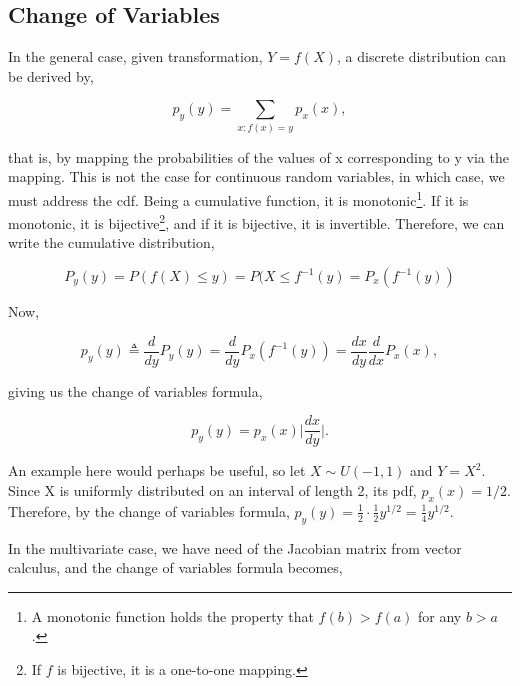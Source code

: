 \documentclass[11pt]{amsart}
\begin{document}
\subsection{Change of Variables}

In the general case, given transformation, $Y = f(X)$, a discrete distribution can be derived by,

$$p_y(y) = \sum_{x:f(x)=y} p_x(x),$$

that is, by mapping the probabilities of the values of x corresponding to y via the mapping. This is not the case for continuous random variables, in which case, we must address the cdf. Being a cumulative function, it is monotonic\footnote{A monotonic function holds the property that $f(b) > f(a)$ for any $b > a$.}. If it is monotonic, it is bijective\footnote{If $f$ is bijective, it is a one-to-one mapping.}, and if it is bijective, it is invertible. Therefore, we can write the cumulative distribution,

$$P_y(y) = P(f(X) \leq y) = P(X \leq f^{-1}(y) = P_x(f^{-1}(y))$$

Now,

$$
p_y(y) \triangleq \frac{d}{dy}P_y(y) = \frac{d}{dy}P_x(f^{-1}(y)) = \frac{dx}{dy}\frac{d}{dx}P_x(x),
$$

giving us the change of variables formula,

$$p_y(y) = p_x(x)\Big|\frac{dx}{dy}\Big|.$$

An example here would perhaps be useful, so let $X \sim U(-1, 1)$ and $Y = X^2$. Since X is uniformly distributed on an interval of length 2, its pdf, $p_x(x) = 1/2$. Therefore, by the change of variables formula, $p_y(y) = \frac{1}{2} \cdot \frac{1}{2}y^{1/2} = \frac{1}{4}y^{1/2}$.

In the multivariate case, we have need of the Jacobian matrix from vector calculus, and the change of variables formula becomes,

%
%
\end{document}

